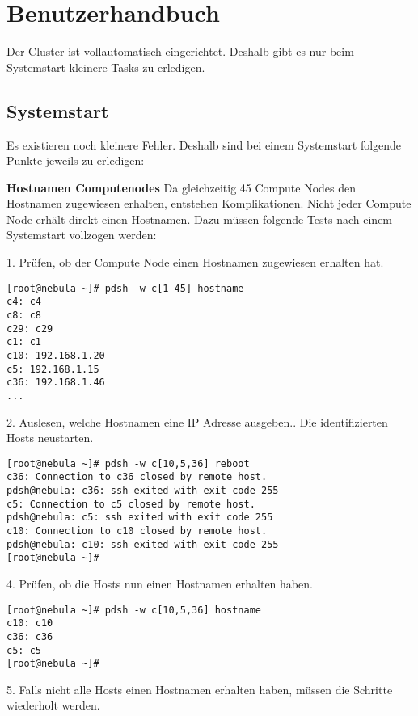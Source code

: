 \section{Benutzerhandbuch}
Der Cluster ist vollautomatisch eingerichtet. Deshalb gibt es nur beim Systemstart kleinere Tasks zu erledigen.

\subsection{Systemstart}
Es existieren noch kleinere Fehler. Deshalb sind bei einem Systemstart folgende Punkte jeweils zu erledigen:

\textbf{Hostnamen Computenodes}\newline
Da gleichzeitig 45 Compute Nodes den Hostnamen zugewiesen erhalten, entstehen Komplikationen. Nicht jeder Compute Node erhält direkt einen Hostnamen. Dazu müssen folgende Tests nach einem Systemstart vollzogen werden:

1. Prüfen, ob der Compute Node einen Hostnamen zugewiesen erhalten hat.
\begin{lstlisting}
[root@nebula ~]# pdsh -w c[1-45] hostname
c4: c4
c8: c8
c29: c29
c1: c1
c10: 192.168.1.20
c5: 192.168.1.15
c36: 192.168.1.46
...
\end{lstlisting}
2. Auslesen, welche Hostnamen eine IP Adresse ausgeben.. Die identifizierten Hosts neustarten.
\begin{lstlisting}
[root@nebula ~]# pdsh -w c[10,5,36] reboot
c36: Connection to c36 closed by remote host.
pdsh@nebula: c36: ssh exited with exit code 255
c5: Connection to c5 closed by remote host.
pdsh@nebula: c5: ssh exited with exit code 255
c10: Connection to c10 closed by remote host.
pdsh@nebula: c10: ssh exited with exit code 255
[root@nebula ~]#
\end{lstlisting}
4. Prüfen, ob die Hosts nun einen Hostnamen erhalten haben.
\begin{lstlisting}
[root@nebula ~]# pdsh -w c[10,5,36] hostname
c10: c10
c36: c36
c5: c5
[root@nebula ~]#
\end{lstlisting}
5. Falls nicht alle Hosts einen Hostnamen erhalten haben, müssen die Schritte wiederholt werden.

